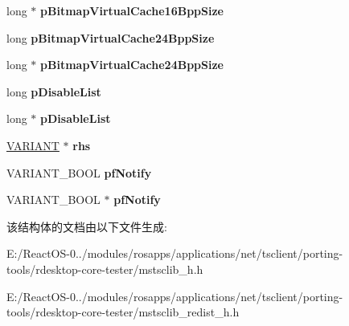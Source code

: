 \begin{DoxyCompactItemize}
long $\ast$ {\bfseries p\+Bitmap\+Virtual\+Cache16\+Bpp\+Size}
\item 
\mbox{\label{struct_i_ms_rdp_client_advanced_settings_vtbl_a5fba63451941ae225a5963c8dd4da07d}} 
long {\bfseries p\+Bitmap\+Virtual\+Cache24\+Bpp\+Size}
\item 
\mbox{\label{struct_i_ms_rdp_client_advanced_settings_vtbl_a58e2b16e0a2f3eab361752ed38976e9f}} 
long $\ast$ {\bfseries p\+Bitmap\+Virtual\+Cache24\+Bpp\+Size}
\item 
\mbox{\label{struct_i_ms_rdp_client_advanced_settings_vtbl_a1bf0d0335ad06e933f69fda5ddddeedf}} 
long {\bfseries p\+Disable\+List}
\item 
\mbox{\label{struct_i_ms_rdp_client_advanced_settings_vtbl_af802aaa57c670529e7e564bb05f5ab34}} 
long $\ast$ {\bfseries p\+Disable\+List}
\item 
\mbox{\label{struct_i_ms_rdp_client_advanced_settings_vtbl_a8ee1095b3581d3c6e3c3cd1d27675e3c}} 
\hyperlink{structtag_v_a_r_i_a_n_t}{V\+A\+R\+I\+A\+NT} $\ast$ {\bfseries rhs}
\item 
\mbox{\label{struct_i_ms_rdp_client_advanced_settings_vtbl_ace3d3c03a59877512d75165d63bafb1d}} 
V\+A\+R\+I\+A\+N\+T\+\_\+\+B\+O\+OL {\bfseries pf\+Notify}
\item 
\mbox{\label{struct_i_ms_rdp_client_advanced_settings_vtbl_ada1c4daf6d2bfd6e052cb93cf64c3380}} 
V\+A\+R\+I\+A\+N\+T\+\_\+\+B\+O\+OL $\ast$ {\bfseries pf\+Notify}
\end{DoxyCompactItemize}


该结构体的文档由以下文件生成\+:\begin{DoxyCompactItemize}
\item 
E\+:/\+React\+O\+S-\/0../modules/rosapps/applications/net/tsclient/porting-\/tools/rdesktop-\/core-\/tester/mstsclib\+\_\+h.\+h\item 
E\+:/\+React\+O\+S-\/0../modules/rosapps/applications/net/tsclient/porting-\/tools/rdesktop-\/core-\/tester/mstsclib\+\_\+redist\+\_\+h.\+h\end{DoxyCompactItemize}
